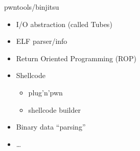 \begin{frame}
  {pwntools/binjitsu}

  \begin{itemize}
    \item I/O abstraction (called Tubes)
    \item ELF parser/info
    \item Return Oriented Programming (ROP)
    \item Shellcode
      \begin{itemize}
        \item plug'n'pwn
        \item shellcode builder
      \end{itemize}
    \item Binary data ``parsing''
    \item \ldots
  \end{itemize}
\end{frame}
